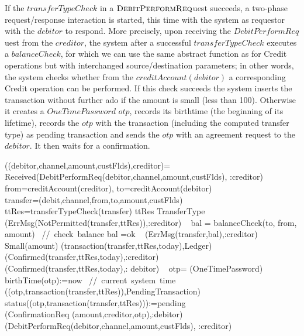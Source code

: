 If the $transferTypeCheck$ in a $ \hbox{\sc DebitPerformReq}$uest succeeds, a two-phase request/response interaction is started, this time with the system as requestor with the $debitor$ to respond. More precisely, upon receiving the $DebitPerformReq$uest from the $creditor$, the system after a successful  $transferTypeCheck$ executes a $balanceCheck$, for which we can use the same abstract function as for Credit operations but with interchanged source/destination parameters; in other words, the system checks whether from the $creditAccount(debitor)$ a corresponding Credit operation can be performed. If this check succeeds the system inserts the transaction without further ado if the amount is small (less than 100). Otherwise it creates a $OneTimePassword$ $otp$, records its birthtime (the beginning of its lifetime), records the $otp$ with the transaction (including the computed transfer type) as pending transaction and sends the $otp$  with an agreement request to the $debitor$. It then waits for a confirmation.


\begin{asm}
((debitor,channel,amount,custFlds),creditor)=\+
\IF  Received(DebitPerformReq(debitor,channel,amount,custFlds),
                 \FROM :creditor) \THEN \+     
  \LET from=creditAccount(creditor), to=creditAccount(debitor)\\
  \LET transfer=(debit,channel,from,to,amount,custFlds) \\
  \LET ttRes=transferTypeCheck(transfer) \+
        \IF ttRes \not \in TransferType \THEN \+    (ErrMsg(NotPermitted(transfer,ttRes)),\TO :creditor)\-
       \ELSE~  \LET bal = balanceCheck(to, from, amount)  
                \mbox{ // check balance}\+
       \IF bal \not =ok \THEN ~ (ErrMsg(transfer,bal),\TO :creditor)   \ELSE \+
         \IF Small(amount) \+
              \THEN \+ 
                   (transaction(transfer,ttRes,today),Ledger) \\
                   (Confirmed(transfer,ttRes,today),\TO :creditor)\\
                   (Confirmed(transfer,ttRes,today),\TO : debitor)\-
              \ELSE ~ \LET otp= \NEW(OneTimePassword)\+
                  birthTime(otp):=now \mbox{ // current system time}\\
                  ((otp,transaction(transfer,ttRes)),PendingTransaction)\\ 
                   status((otp,transaction(transfer,ttRes))):=pending \\
                   (ConfirmationReq
                    (amount,creditor,otp),\TO :debitor)\dec\dec\dec\dec\-
   (DebitPerformReq(debitor,channel,amount,custFlds),
                 \FROM :creditor)
\end{asm}
             
